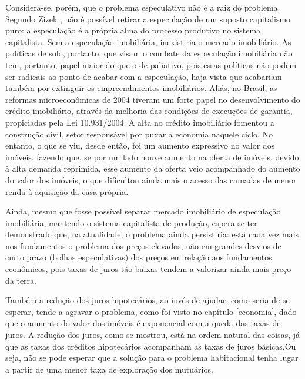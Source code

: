 \documentclass[
	12pt,				%
	oneside,			%
	a4paper,			%
	chapter=TITLE,		%
	section=TITLE,		%
	english,			%
	brazil				%
	]{abntex2}
\begin{document}
\begin{refsection}
Considera-se, porém, que o problema especulativo não é a raiz do problema.
Segundo Zizek \autocite*[220-221]{zizek2005}, não é possível retirar a especulação de um
suposto capitalismo puro: a especulação é a própria alma do processo produtivo
no sistema capitalista. Sem a especulação imobiliária, inexistiria o mercado
imobiliário. As políticas de solo, portanto, que visam o combate da especulação
imobiliária não tem, portanto, papel maior do que o de paliativo, pois essas
políticas não podem ser radicais ao ponto de acabar com a especulação, haja
vista que acabariam também por extinguir os empreendimentos imobiliários. Aliás,
no Brasil, as reformas microeconômicas de 2004 tiveram um forte papel no
desenvolvimento do crédito imobiliário, através da melhoria das condições de
execuções de garantia, propiciadas pela Lei 10.931/2004. A alta no crédito
imobiliário fomentou a construção civil, setor responsável por puxar a economia
naquele ciclo. No entanto, o que se viu, desde então, foi um aumento expressivo
no valor dos imóveis, fazendo que, se por um lado houve aumento na oferta de
imóveis, devido à alta demanda reprimida, esse aumento da oferta veio
acompanhado do aumento do valor dos imóveis, o que dificultou ainda mais o
acesso das camadas de menor renda à aquisição da casa própria.

Ainda, mesmo que fosse possível separar mercado imobiliário de especulação
imobiliária, mantendo o sistema capitalista de produção, espera-se ter
demonstrado que, na atualidade, o problema ainda persistiria: está cada vez mais
nos fundamentos o problema dos preços elevados, não em grandes desvios de curto
prazo (bolhas especulativas) dos preços em relação aos fundamentos econômicos,
pois taxas de juros tão baixas tendem a valorizar ainda mais preço da terra.

Também a redução dos juros hipotecários, ao invés de ajudar, como seria de se
esperar, tende a agravar o problema, como foi visto no capítulo \ref{economia},
dado que o aumento do valor dos imóveis é exponencial com a queda das taxas de
juros. A redução dos juros, como se mostrou, está na ordem natural das
coisas, já que as taxas dos créditos hipotecários acompanham as taxas de juros
básicas.Ou seja, não se pode esperar que a solução para o problema habitacional
tenha lugar a partir de uma menor taxa de exploração dos mutuários.


\end{refsection}
\end{document}
